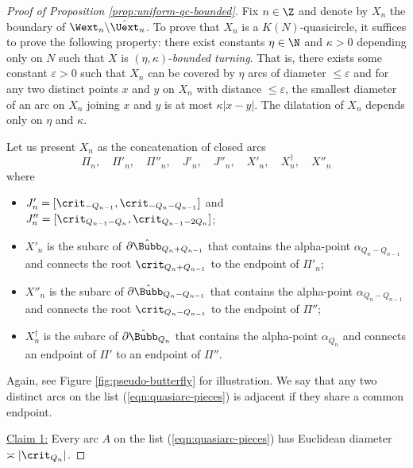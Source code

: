 \documentclass{amsart}
\begin{document}
\begin{proof}[Proof of Proposition \ref{prop:uniform-qc-bounded}]
    Fix $n \in \Z$ and denote by $X_n$ the boundary of $\Wext_n \backslash \hat{\Uext}_n$. 
    To prove that $X_n$ is a $K(N)$-quasicircle, it suffices to prove the following property: 
    there exist constants $\eta \in \N$ and $\kappa>0$ depending only on $N$ such that $X$ is $(\eta,\kappa)$-\emph{bounded turning}. 
    That is, there exists some constant $\varepsilon>0$ such that $X_n$ can be covered by $\eta$ arcs of diameter $\leq \varepsilon$ and for any two distinct points $x$ and $y$ on $X_n$ with distance $\leq \varepsilon$, the smallest diameter of an arc on $X_n$ joining $x$ and $y$ is at most $\kappa |x-y|$.
    The dilatation of $X_n$ depends only on $\eta$ and $\kappa$.

    Let us present $X_n$ as the concatenation of closed arcs 
    \begin{equation}
    \label{eqn:quasiarc-pieces}
        \Pi_n, \quad \Pi'_n, \quad \Pi''_n, \quad J'_n, \quad J''_n, \quad X'_n, \quad X^\dagger_n, \quad X''_n
    \end{equation}
    where 
    \begin{itemize}
        \item $J'_n = [\crit_{-Q_{n-1}},\crit_{-Q_n-Q_{n-1}}]$ and $J''_n=[\crit_{Q_{n-1}-Q_n},\crit_{Q_{n-1}-2 Q_{n}}]$;
        \item $X'_n$ is the subarc of $\partial \hat{\Bubb}_{Q_n+Q_{n-1}}$ that contains the alpha-point $\alpha_{Q_n-Q_{n-1}}$ and connects the root $\crit_{Q_n+Q_{n-1}}$ to the endpoint of $\Pi'_n$;
        \item $X''_n$ is the subarc of $\partial \hat{\Bubb}_{Q_{n}-Q_{n-1}}$ that contains the alpha-point $\alpha_{Q_{n}-Q_{n-1}}$ and connects the root $\crit_{Q_{n}-Q_{n-1}}$ to the endpoint of $\Pi''$;
        \item $X^\dagger_n$ is the subarc of $\partial \hat{\Bubb}_{Q_n}$ that contains the alpha-point $\alpha_{Q_{n}}$ and connects an endpoint of $\Pi'$ to an endpoint of $\Pi''$.
    \end{itemize}
    Again, see Figure \ref{fig:pseudo-butterfly} for illustration.
    We say that any two distinct arcs on the list (\ref{eqn:quasiarc-pieces}) is adjacent if they share a common endpoint.
    \vspace{0.1in}

    \noindent \underline{Claim 1:}
        Every arc $A$ on the list (\ref{eqn:quasiarc-pieces}) has Euclidean diameter $\asymp |\crit_{Q_n}|$.


\end{proof}
\end{document}
